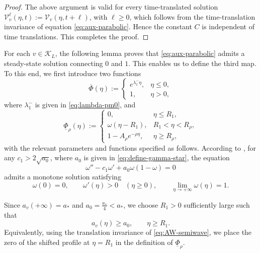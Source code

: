 \documentclass[preprint,sort&compress,final,12pt]{elsarticle}
\numberwithin{equation}{section}
\begin{document}
\begin{proof}
The above argument is valid for every time-translated solution $\mathcal V_v^\ell(\eta,t):=\mathcal V_v(\eta,t+\ell)$, with $\ell\ge0$, which follows from the time-translation invariance of equation \eqref{eq:aux-parabolic}. Hence the constant $C$ is independent of time translations. This completes the proof.
\end{proof}

For each $v\in\mathcal K_L$, the following lemma proves that \eqref{eq:aux-parabolic} admits a steady-state solution connecting $0$ and $1$. This enables us to define the third map. To this end, we first introduce two functions
\begin{equation}\label{eq:super}
\overline\Phi(\eta):=
\begin{cases}
e^{\lambda_1^{-}\eta}, & \eta\le0,\\[0.2cm]
1,                     & \eta>0,
\end{cases}
\end{equation}
where $\lambda_1^{-}$ is given in \eqref{eq:lambda-pm0}, and
\begin{equation}\label{eq:lower-barrier-def}
\underline\Phi_\rho(\eta):=
\begin{cases}
0,                      & \eta\le R_1,\\[0.2cm]
\omega(\eta-R_1),       & R_1<\eta<R_\rho,\\[0.2cm]
1-A_\rho e^{-\rho\eta}, & \eta\ge R_\rho,
\end{cases}
\end{equation}
with the relevant parameters and functions specified as follows. According to \cite{AronsonWeinberger}, for any $c_1>2\sqrt{a_0}$, where $a_0$ is given in \eqref{eq:define-gamma-star}, the equation
\begin{equation}\label{eq:AW-semiwave}
\omega''-c_1\omega'+a_0\omega(1-\omega)=0
\end{equation}
admits a monotone solution satisfying
\begin{equation*}
\omega(0)=0,\qquad \omega'(\eta)>0\quad(\eta\ge0),\qquad
\lim_{\eta\to+\infty}\omega(\eta)=1.
\end{equation*}

Since $a_v(+\infty)=a_*$ and $a_0=\frac{a_*}{4}<a_*$, we choose $R_1>0$ sufficiently large such that
\begin{equation}\label{eq:av-lower-middle}
a_v(\eta)\ge a_0,\qquad \eta\ge R_1.
\end{equation}
Equivalently, using the translation invariance of \eqref{eq:AW-semiwave}, we place the zero of the shifted profile at $\eta=R_1$ in the definition of $\underline\Phi_\rho$.
\end{document}
